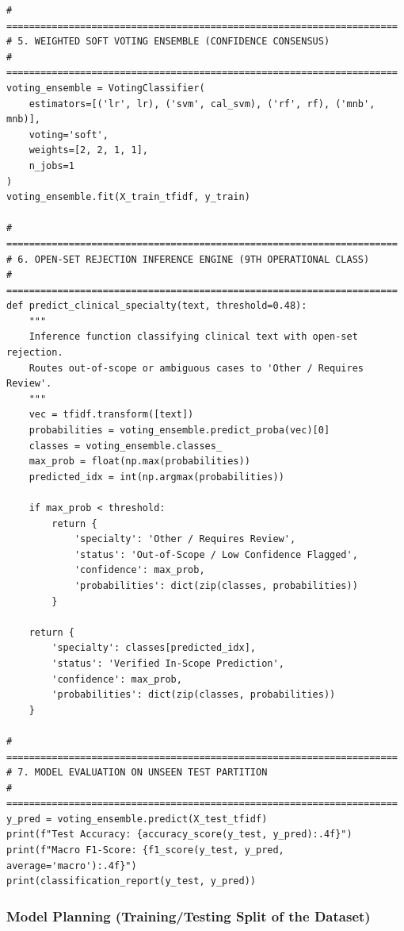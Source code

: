 \begin{footnotesize}
\begin{verbatim}
# =====================================================================
# 5. WEIGHTED SOFT VOTING ENSEMBLE (CONFIDENCE CONSENSUS)
# =====================================================================
voting_ensemble = VotingClassifier(
    estimators=[('lr', lr), ('svm', cal_svm), ('rf', rf), ('mnb', mnb)],
    voting='soft',
    weights=[2, 2, 1, 1],
    n_jobs=1
)
voting_ensemble.fit(X_train_tfidf, y_train)

# =====================================================================
# 6. OPEN-SET REJECTION INFERENCE ENGINE (9TH OPERATIONAL CLASS)
# =====================================================================
def predict_clinical_specialty(text, threshold=0.48):
    """
    Inference function classifying clinical text with open-set rejection.
    Routes out-of-scope or ambiguous cases to 'Other / Requires Review'.
    """
    vec = tfidf.transform([text])
    probabilities = voting_ensemble.predict_proba(vec)[0]
    classes = voting_ensemble.classes_
    max_prob = float(np.max(probabilities))
    predicted_idx = int(np.argmax(probabilities))
    
    if max_prob < threshold:
        return {
            'specialty': 'Other / Requires Review',
            'status': 'Out-of-Scope / Low Confidence Flagged',
            'confidence': max_prob,
            'probabilities': dict(zip(classes, probabilities))
        }
    
    return {
        'specialty': classes[predicted_idx],
        'status': 'Verified In-Scope Prediction',
        'confidence': max_prob,
        'probabilities': dict(zip(classes, probabilities))
    }

# =====================================================================
# 7. MODEL EVALUATION ON UNSEEN TEST PARTITION
# =====================================================================
y_pred = voting_ensemble.predict(X_test_tfidf)
print(f"Test Accuracy: {accuracy_score(y_test, y_pred):.4f}")
print(f"Macro F1-Score: {f1_score(y_test, y_pred, average='macro'):.4f}")
print(classification_report(y_test, y_pred))
\end{verbatim}
\end{footnotesize}
\vspace{4pt}

\subsubsection{Model Planning (Training/Testing Split of the Dataset)}

